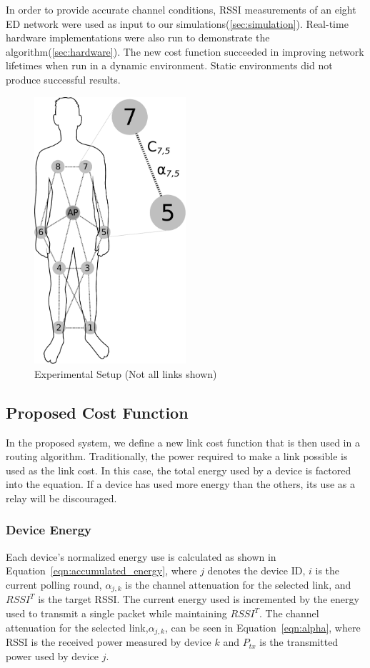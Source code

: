 \documentclass{article}
\begin{document}
In order to provide accurate channel conditions, RSSI measurements of an eight ED network were used as input to our simulations(\ref{sec:simulation}). Real-time hardware implementations were also run to demonstrate the algorithm(\ref{sec:hardware}). The new cost function succeeded in improving network lifetimes when run in a dynamic environment. Static environments did not produce successful results.

\begin{figure}[!htb]
\begin{center}
\includegraphics[width=0.5\textwidth]{figures/body.pdf}
\end{center}
\caption{Experimental Setup (Not all links shown)}
\label{fig:body}
\end{figure}

\subsection{Proposed Cost Function}
In the proposed system, we define a new link cost function that is then used in a routing algorithm. Traditionally, the power required to make a link possible is used as the link cost. In this case, the total energy used by a device is factored into the equation. If a device has used more energy than the others, its use as a relay will be discouraged.

\subsubsection{Device Energy}
Each device's normalized energy use is calculated as shown in Equation~\ref{eqn:accumulated_energy}, where $j$ denotes the device ID, $i$ is the current polling round, $\alpha_{j,k}$ is the channel attenuation for the selected link, and $RSSI^T$ is the target RSSI. The current energy used is incremented by the energy used to transmit a single packet while maintaining $RSSI^T$. The channel attenuation for the selected link,$\alpha_{j,k}$, can be seen in Equation~\ref{eqn:alpha}, where RSSI is the received power measured by device $k$ and $P_{tx}$ is the transmitted power used by device $j$. 
\end{document}
